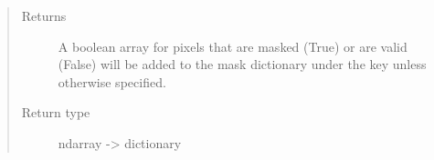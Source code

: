 \documentclass[letterpaper,10pt,english]{sphinxmanual}
\begin{document}
\begin{fulllineitems}
\begin{quote}
\begin{description}
\begin{itemize}
\end{itemize}

\item[{Returns}] \leavevmode
{} \textendash{} A boolean array for pixels that are masked (True) or are valid (False)
will be added to the mask dictionary under the key
 unless otherwise specified.

\item[{Return type}] \leavevmode
ndarray -\textgreater{} dictionary

\end{description}\end{quote}

\end{fulllineitems}

\end{document}

